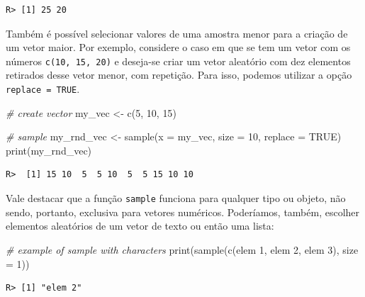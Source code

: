 \documentclass[
  11pt,
]{book}
\newenvironment{Shaded}{\begin{snugshade}}{\end{snugshade}}
\newcommand{\AttributeTok}[1]{\textcolor[rgb]{0.61,0.61,0.61}{#1}}
\newcommand{\CommentTok}[1]{\textcolor[rgb]{0.37,0.37,0.37}{\textit{#1}}}
\newcommand{\ConstantTok}[1]{\textcolor[rgb]{0,0,0}{#1}}
\newcommand{\DecValTok}[1]{\textcolor[rgb]{0.06,0.06,0.06}{#1}}
\newcommand{\FunctionTok}[1]{\textcolor[rgb]{0,0,0}{#1}}
\newcommand{\NormalTok}[1]{#1}
\newcommand{\OtherTok}[1]{\textcolor[rgb]{0.37,0.37,0.37}{#1}}
\newcommand{\StringTok}[1]{\textcolor[rgb]{0.5,0.5,0.5}{#1}}
\begin{document}
\begin{verbatim}
R> [1] 25 20
\end{verbatim}

Também é possível selecionar valores de uma amostra menor para a criação de um vetor maior. Por exemplo, considere o caso em que se tem um vetor com os números \texttt{c(10,\ 15,\ 20)} e deseja-se criar um vetor aleatório com dez elementos retirados desse vetor menor, com repetição. Para isso, podemos utilizar a opção \texttt{replace\ =\ TRUE}.

\begin{Shaded}
\begin{Highlighting}[]
\CommentTok{\# create vector}
\NormalTok{my\_vec }\OtherTok{\textless{}{-}} \FunctionTok{c}\NormalTok{(}\DecValTok{5}\NormalTok{, }\DecValTok{10}\NormalTok{, }\DecValTok{15}\NormalTok{)}

\CommentTok{\# sample}
\NormalTok{my\_rnd\_vec }\OtherTok{\textless{}{-}} \FunctionTok{sample}\NormalTok{(}\AttributeTok{x =}\NormalTok{ my\_vec, }\AttributeTok{size =} \DecValTok{10}\NormalTok{, }\AttributeTok{replace =} \ConstantTok{TRUE}\NormalTok{)}
\FunctionTok{print}\NormalTok{(my\_rnd\_vec)}
\end{Highlighting}
\end{Shaded}

\begin{verbatim}
R>  [1] 15 10  5  5 10  5  5 15 10 10
\end{verbatim}

Vale destacar que a função \texttt{sample} funciona para qualquer tipo ou objeto, não sendo, portanto, exclusiva para vetores numéricos. Poderíamos, também, escolher elementos aleatórios de um vetor de texto ou então uma lista:

\begin{Shaded}
\begin{Highlighting}[]
\CommentTok{\# example of sample with characters}
\FunctionTok{print}\NormalTok{(}\FunctionTok{sample}\NormalTok{(}\FunctionTok{c}\NormalTok{(}\StringTok{\textquotesingle{}elem 1\textquotesingle{}}\NormalTok{, }\StringTok{\textquotesingle{}elem 2\textquotesingle{}}\NormalTok{, }\StringTok{\textquotesingle{}elem 3\textquotesingle{}}\NormalTok{),}
             \AttributeTok{size =} \DecValTok{1}\NormalTok{))}
\end{Highlighting}
\end{Shaded}

\begin{verbatim}
R> [1] "elem 2"
\end{verbatim}
\end{document}
